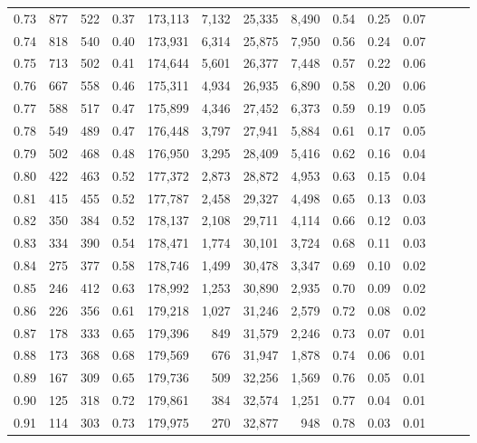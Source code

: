 \begin{tabular}{rrrrrrrrrrrrrr}
0.73 &    877 &  522 &  0.37 &  173,113 &    7,132 &  25,335 &   8,490 &  0.54 &  0.25 &      0.07 \\
0.74 &    818 &  540 &  0.40 &  173,931 &    6,314 &  25,875 &   7,950 &  0.56 &  0.24 &      0.07 \\
0.75 &    713 &  502 &  0.41 &  174,644 &    5,601 &  26,377 &   7,448 &  0.57 &  0.22 &      0.06 \\
0.76 &    667 &  558 &  0.46 &  175,311 &    4,934 &  26,935 &   6,890 &  0.58 &  0.20 &      0.06 \\
0.77 &    588 &  517 &  0.47 &  175,899 &    4,346 &  27,452 &   6,373 &  0.59 &  0.19 &      0.05 \\
0.78 &    549 &  489 &  0.47 &  176,448 &    3,797 &  27,941 &   5,884 &  0.61 &  0.17 &      0.05 \\
0.79 &    502 &  468 &  0.48 &  176,950 &    3,295 &  28,409 &   5,416 &  0.62 &  0.16 &      0.04 \\
0.80 &    422 &  463 &  0.52 &  177,372 &    2,873 &  28,872 &   4,953 &  0.63 &  0.15 &      0.04 \\
0.81 &    415 &  455 &  0.52 &  177,787 &    2,458 &  29,327 &   4,498 &  0.65 &  0.13 &      0.03 \\
0.82 &    350 &  384 &  0.52 &  178,137 &    2,108 &  29,711 &   4,114 &  0.66 &  0.12 &      0.03 \\
0.83 &    334 &  390 &  0.54 &  178,471 &    1,774 &  30,101 &   3,724 &  0.68 &  0.11 &      0.03 \\
0.84 &    275 &  377 &  0.58 &  178,746 &    1,499 &  30,478 &   3,347 &  0.69 &  0.10 &      0.02 \\
0.85 &    246 &  412 &  0.63 &  178,992 &    1,253 &  30,890 &   2,935 &  0.70 &  0.09 &      0.02 \\
0.86 &    226 &  356 &  0.61 &  179,218 &    1,027 &  31,246 &   2,579 &  0.72 &  0.08 &      0.02 \\
0.87 &    178 &  333 &  0.65 &  179,396 &      849 &  31,579 &   2,246 &  0.73 &  0.07 &      0.01 \\
0.88 &    173 &  368 &  0.68 &  179,569 &      676 &  31,947 &   1,878 &  0.74 &  0.06 &      0.01 \\
0.89 &    167 &  309 &  0.65 &  179,736 &      509 &  32,256 &   1,569 &  0.76 &  0.05 &      0.01 \\
0.90 &    125 &  318 &  0.72 &  179,861 &      384 &  32,574 &   1,251 &  0.77 &  0.04 &      0.01 \\
0.91 &    114 &  303 &  0.73 &  179,975 &      270 &  32,877 &     948 &  0.78 &  0.03 &      0.01 \\

\end{tabular}
